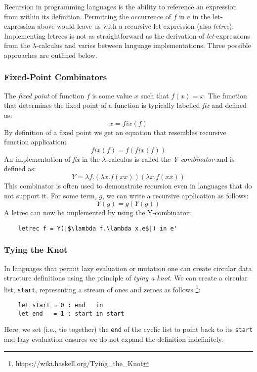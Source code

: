 \documentclass[a4paper,12pt,twoside,openright]{report}
\theoremstyle{definition}
\begin{document}
Recursion in programming languages is the ability to reference an expression from within its definition. Permitting the occurrence of $f$ in $e$ in the let-expression above would leave us with a recursive let-expression (also \textit{letrec}). Implementing letrecs is not as straightforward as the derivation of \textit{let}-expressions from the $\lambda$-calculus and varies between language implementations. Three possible approaches are outlined below.

\subsubsection{Fixed-Point Combinators}
The \textit{fixed point} of function $f$ is some value $x$ such that $f(x)=x$. The function that determines the fixed point of a function is typically labelled \textit{fix} and defined as:
\begin{equation*}
    x = \mathit{fix}(f)
\end{equation*}
By definition of a fixed point we get an equation that resembles recursive function application:
\begin{equation*}
    \mathit{fix}(f) = f (\mathit{fix}(f))
\end{equation*}
An implementation of \textit{fix} in the $\lambda$-calculus is called the \textit{Y-combinator} and is defined as:
\begin{equation*}
    Y=\lambda f.(\lambda x.f(x x)) (\lambda x.f(x x))
\end{equation*}
This combinator is often used to demonstrate recursion even in languages that do not support it. For some term, $g$, we can write a recursive application as follows:
\begin{equation*}
    Y(g) = g(Y(g))
\end{equation*}
A letrec can now be implemented by using the Y-combinator:
\begin{verbatim}
    letrec f = Y(|$\lambda f.\lambda x.e$|) in e'
\end{verbatim}

\subsubsection{Tying the Knot}\label{ssubsec:background_knot}
In languages that permit lazy evaluation or mutation one can create circular data structure definitions using the principle of \textit{tying a knot}. We can create a circular list, \texttt{start}, representing a stream of ones and zeroes as follows \footnote{https://wiki.haskell.org/Tying\_the\_Knot}:
\begin{verbatim}
    let start = 0 : end   in
    let end   = 1 : start in start
\end{verbatim}
Here, we set (i.e., tie together) the \texttt{end} of the cyclic list to point back to its \texttt{start} and lazy evaluation ensures we do not expand the definition indefinitely.
\end{document}

